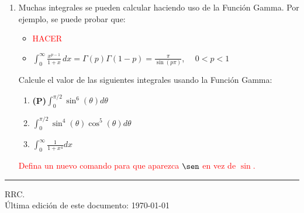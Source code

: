 \documentclass[11pt]{article}
\begin{document}
\begin{enumerate}
\item Muchas integrales se pueden calcular haciendo uso de la Funci\'on Gamma.
  Por ejemplo, se puede probar que:
  \begin{itemize}
  \item \textcolor{red}{HACER}
  \item $\int_{0}^{\infty}\frac{x^{p-1}}{1+x}\,dx
    =\Gamma(p)\Gamma(1-p)=\frac{\pi}{\sin(p\pi)}$, $ \quad 0<p<1$
  \end{itemize}

  Calcule el valor de las siguientes integrales usando la Funci\'on Gamma:
  \begin{multicols}{3}
    \begin{enumerate}
    \item {\bf (P)}$\int_{0}^{\pi/2}\sin^{6}(\theta)d\theta$
    \item $\int_{0}^{\pi/2}\sin^{4}(\theta)\cos^{5}(\theta)d\theta$
    \item $\int_{0}^{\infty}\frac{1}{1+x^{4}}dx$
    \end{enumerate}
  \end{multicols}
  \textcolor{red}{Defina un nuevo comando para que aparezca
    $\operatorname{\sen}$ en vez de $\sin$.}


\end{enumerate}


\vfill
\hrule
\vspace{4px}
\noindent RRC. \\
\'Ultima edici\'on de este documento: \today
\end{document}
